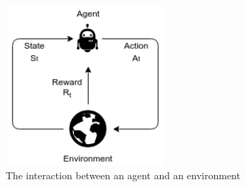 \documentclass[11pt,twoside]{report}
\theoremstyle{plain}
\theoremstyle{definition}
\begin{document}
\begin{figure}[!htb]
\centering
\includegraphics[width=6cm, height=6cm]{./figures/agent_env}
\caption{The interaction between an agent and an environment}
\label{agent_env}
\end{figure}
\end{document}
